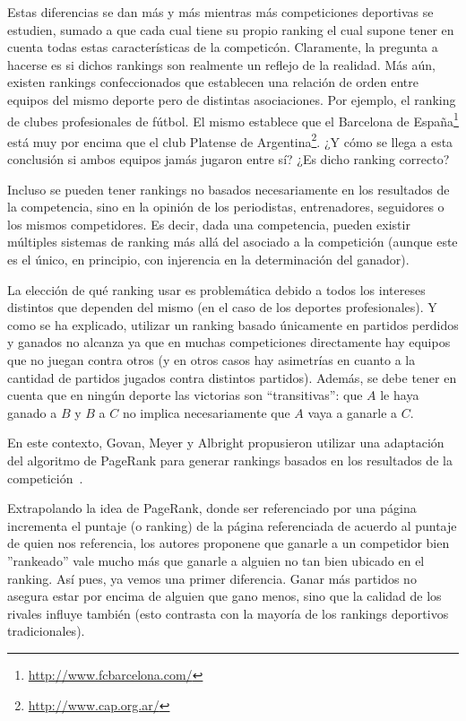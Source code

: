 \par Estas diferencias se dan m\'as y m\'as mientras m\'as competiciones
deportivas se estudien, sumado a que cada cual tiene su propio ranking el cual
supone tener en cuenta todas estas caracter\'isticas de la competic\'on.
Claramente, la pregunta a hacerse es si dichos rankings son realmente un reflejo
de la realidad. M\'as a\'un, existen rankings confeccionados que establecen una
relaci\'on de orden entre equipos del mismo deporte pero de distintas
asociaciones. Por ejemplo, el ranking de clubes profesionales de f\'utbol. El
mismo establece que el Barcelona de
Espa\~na\footnote{\url{http://www.fcbarcelona.com/}} est\'a muy por encima que
el club Platense de Argentina\footnote{\url{http://www.cap.org.ar/}}. ¿Y c\'omo
se llega a esta conclusi\'on si ambos equipos jam\'as jugaron entre sí? ¿Es
dicho ranking correcto?

\par Incluso se pueden tener rankings no basados necesariamente en los
resultados de la competencia, sino en la opini\'on de los periodistas,
entrenadores, seguidores o los mismos competidores. Es decir, dada una
competencia, pueden existir m\'ultiples sistemas de ranking m\'as all\'a del
asociado a la competici\'on (aunque este es el \'unico, en principio,
con injerencia en la determinaci\'on del ganador).

\par La elecci\'on de qué ranking usar es problem\'atica debido a todos los
intereses distintos que dependen del mismo (en el caso de los deportes
profesionales). Y como se ha explicado, utilizar un ranking basado \'unicamente
en partidos perdidos y ganados no alcanza ya que en muchas competiciones
directamente hay equipos que no juegan contra otros (y en otros casos hay
asimetr\'ias en cuanto a la cantidad de partidos jugados contra distintos
partidos). Además, se debe tener en cuenta que en ningún deporte las victorias
son ``transitivas'': que $A$ le haya ganado a $B$ y $B$ a $C$ no implica
necesariamente que $A$ vaya a ganarle a $C$. %

\par En este contexto, Govan, Meyer y Albright propusieron utilizar una
adaptaci\'on del algoritmo de PageRank para generar rankings basados en los
resultados de la competici\'on~\cite{Govan2008}.

\par Extrapolando la idea de PageRank, donde ser referenciado por una p\'agina
incrementa el puntaje (o ranking) de la p\'agina referenciada de acuerdo al
puntaje de quien nos referencia, los autores proponene que ganarle a un
competidor bien ''rankeado'' vale mucho m\'as que ganarle a alguien no tan bien
ubicado en el ranking. As\'i pues, ya vemos una primer diferencia. Ganar m\'as
partidos no asegura estar por encima de alguien que gano menos, sino que la
calidad de los rivales influye tambi\'en (esto contrasta con la mayor\'ia de los
rankings deportivos tradicionales).

